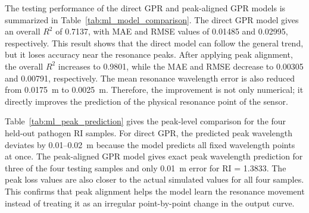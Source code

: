 \documentclass[preprint,12pt]{elsarticle}
\begin{document}
The testing performance of the direct GPR and peak-aligned GPR models is summarized in Table~\ref{tab:ml_model_comparison}. The direct GPR model gives an overall $R^2$ of 0.7137, with MAE and RMSE values of 0.01485 and 0.02995, respectively. This result shows that the direct model can follow the general trend, but it loses accuracy near the resonance peaks. After applying peak alignment, the overall $R^2$ increases to 0.9801, while the MAE and RMSE decrease to 0.00305 and 0.00791, respectively. The mean resonance wavelength error is also reduced from 0.0175~\textmu m to 0.0025~\textmu m. Therefore, the improvement is not only numerical; it directly improves the prediction of the physical resonance point of the sensor.

\begin{table}[!t]
\centering
\caption{Testing performance comparison between direct GPR and peak-aligned GPR.}
\label{tab:ml_model_comparison}
\renewcommand{\arraystretch}{1.35}
\setlength{\tabcolsep}{6pt}
\small
{}
\end{table}

Table~\ref{tab:ml_peak_prediction} gives the peak-level comparison for the four held-out pathogen RI samples. For direct GPR, the predicted peak wavelength deviates by 0.01--0.02~\textmu m because the model predicts all fixed wavelength points at once. The peak-aligned GPR model gives exact peak wavelength prediction for three of the four testing samples and only 0.01~\textmu m error for RI = 1.3833. The peak loss values are also closer to the actual simulated values for all four samples. This confirms that peak alignment helps the model learn the resonance movement instead of treating it as an irregular point-by-point change in the output curve.
\end{document}

